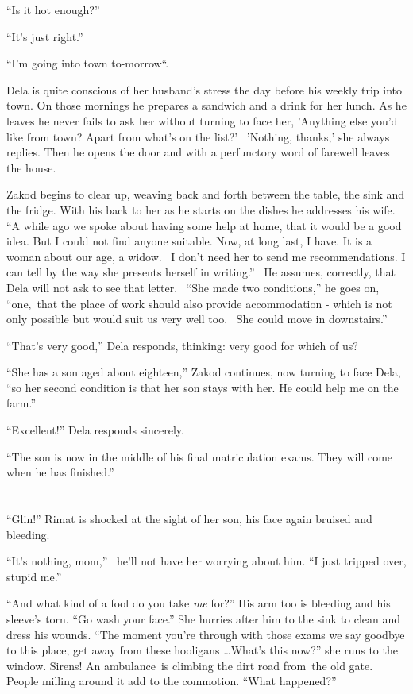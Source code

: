 \documentclass[twoside,11pt]{book}
\begin{document}
``Is it hot enough?''

``It's just right.''

``I'm going into town to-morrow``.

Dela is quite conscious of her husband's stress the day before his weekly trip into town. On those mornings he prepares
a sandwich and a drink for her lunch. As he leaves he never fails to ask her without turning to face her, 'Anything
else you'd like from town? Apart from what's on the list?' \ {}'Nothing, thanks,' she always replies. Then he opens the
door and with a perfunctory word of farewell leaves the house.

Zakod begins to clear up, weaving back and forth between the table, the sink and the fridge. With his back to her as he
starts on the dishes he addresses his wife. ``A while ago we spoke about having some help at home, that it
would be a good idea. But I could not find anyone suitable. Now, at long last, I have. It is a woman about our age, a
widow.~ I don't need her to send me recommendations. I can tell by the way she presents herself in
writing.'' \ He assumes, correctly, that Dela will not ask to see that letter. \ ``She made
two conditions,'' he goes on, ``one,~that the place of work should also provide accommodation - which is
not only possible but would suit us very well too.~ She could move in downstairs.''

``That's very good,'' Dela responds, thinking: very good for which of us?

``She has a son aged about eighteen,'' Zakod continues, now turning to face Dela,
``so her second condition is that her son stays with her. He could help me on the farm.''

``Excellent!'' Dela responds sincerely.

{}``The son is now in the middle of his final matriculation exams. They will come when he has finished.''


\bigskip

\chapter{}

``Glin!'' Rimat is shocked at the sight of her son, his face again bruised and bleeding.

``It's nothing, mom,'' \ he'll not have her worrying about him. ``I just tripped over, stupid
me.''

``And what kind of a fool do you take \textit{me} for?'' His arm too is bleeding and his
sleeve's torn. ``Go wash your face.'' She hurries after him to the sink to clean and dress
his wounds. ``The moment you're through with those exams we say goodbye to this place, get away from these
hooligans {\dots}What's this now?'' she runs to the window. Sirens! An ambulance~is climbing the dirt road
from~the old gate. People milling around it add to the commotion. ``What happened?''
\end{document}
